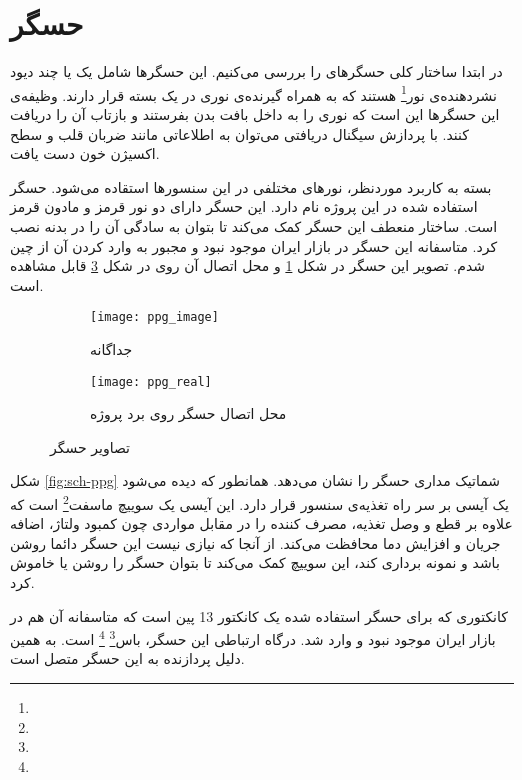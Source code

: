 \section{حسگر }
در ابتدا ساختار کلی حسگرهای
را بررسی می‌کنیم. این حسگرها شامل یک یا چند دیود نشردهنده‌ی نور\footnote{} هستند که به همراه گیرنده‌ی نوری در یک بسته قرار دارند. وظیفه‌ی این حسگرها این است که نوری را به داخل بافت بدن بفرستند و بازتاب آن را دریافت کنند. با پردازش سیگنال دریافتی می‌توان به اطلاعاتی مانند ضربان قلب و سطح اکسیژن خون دست یافت.

بسته به کاربرد موردنظر، نورهای مختلفی در این سنسورها استقاده می‌شود. حسگر استفاده شده در این پروژه  نام دارد. این حسگر دارای دو نور قرمز و مادون قرمز است. ساختار منعطف این حسگر کمک می‌کند تا بتوان به سادگی آن را در بدنه نصب کرد. متاسفانه این حسگر در بازار ایران موجود نبود و مجبور به وارد کردن آن از چین شدم. تصویر این حسگر در شکل \ref{fig:ppg_image} و محل اتصال آن روی \pcbf در شکل \ref{fig:ppg_real} قابل مشاهده است.

\begin{figure}[h]
	\centering
	\begin{subfigure}{0.45\textwidth}
		\centering
		\texttt{[image: ppg\_image]}
		\caption{جداگانه}
		\label{fig:ppg_image}
	\end{subfigure}
	\begin{subfigure}{0.35\textwidth}
		\centering
		\texttt{[image: ppg\_real]}
		\caption{محل اتصال حسگر روی برد پروژه}
		\label{fig:ppg_real}
	\end{subfigure}
	\caption{تصاویر حسگر }
\end{figure}

شکل \ref{fig:sch-ppg} شماتیک مداری حسگر  را نشان می‌دهد. همانطور که دیده می‌شود یک آیسی  بر سر راه تغذیه‌ی سنسور قرار دارد. این آیسی یک سوییچ ماسفت\footnote{} است که علاوه بر قطع و وصل تغذیه، مصرف کننده را در مقابل مواردی چون کمبود ولتاژ، اضافه جریان و افزایش دما محافظت می‌کند. از آنجا که نیازی نیست این حسگر دائما روشن باشد و نمونه برداری کند، این سوییچ کمک می‌کند تا بتوان حسگر را روشن یا خاموش کرد.

کانکتوری که برای حسگر استفاده شده یک کانکتور  13 پین است که متاسفانه آن هم در بازار ایران موجود نبود و وارد شد.
درگاه ارتباطی این حسگر، باس\footnote{}
\footnote{}
است. به همین دلیل  پردازنده به این حسگر متصل است.

